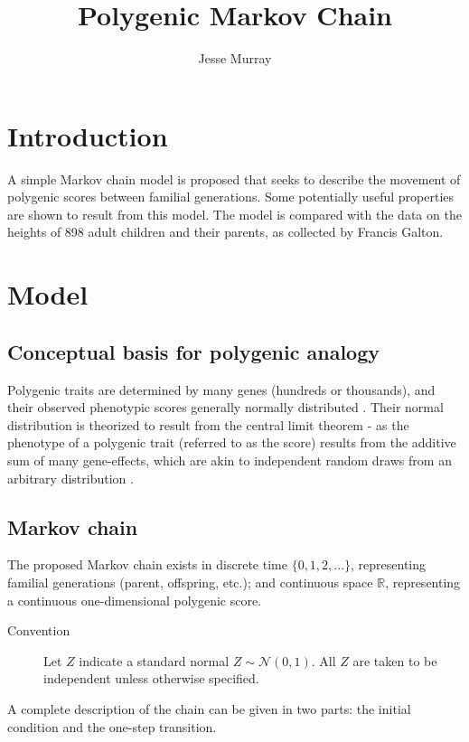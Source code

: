 \documentclass[a4paper,11pt]{article}
\title{Polygenic Markov Chain}
\author{Jesse Murray}
\begin{document}
\maketitle
\thispagestyle{empty}
\newpage
{}

\section{Introduction}
A simple Markov chain model is proposed that seeks to describe the movement of polygenic scores between familial generations. Some potentially useful properties are shown to result from this model. The model is compared with the data on the heights of 898 adult children and their parents, as collected by Francis Galton. 


\section{Model}

\subsection{Conceptual basis for polygenic analogy}

Polygenic traits are determined by many genes (hundreds or thousands), and their observed phenotypic scores generally normally distributed \cite{lange_article, lange_book}. Their normal distribution is theorized to result from the central limit theorem - as the phenotype of a polygenic trait (referred to as the score) results from the additive sum of many gene-effects, which are akin to independent random draws from an arbitrary distribution \cite{rieger}.


\subsection{Markov chain}
The proposed Markov chain exists in discrete time $\{0, 1, 2,...\}$, representing familial generations (parent, offspring, etc.); and continuous space $\mathbb{R}$, representing a continuous one-dimensional polygenic score. 

\begin{description}
\item [Convention] Let $Z$ indicate a standard normal $Z \sim \mathcal{N}(0, 1)$. All $Z$ are taken to be independent unless otherwise specified.
\end{description}

A complete description of the chain can be given in two parts: the initial condition and the one-step transition. 
\end{document}
